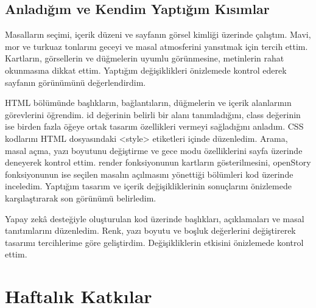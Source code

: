 \documentclass[12pt,a4paper]{article}
\begin{document}
\subsection{Anladığım ve Kendim Yaptığım Kısımlar}
Masalların seçimi, içerik düzeni ve sayfanın görsel kimliği üzerinde çalıştım. Mavi, mor ve turkuaz tonlarını geceyi ve masal atmosferini yansıtmak için tercih ettim. Kartların, görsellerin ve düğmelerin uyumlu görünmesine, metinlerin rahat okunmasına dikkat ettim. Yaptığım değişiklikleri önizlemede kontrol ederek sayfanın görünümünü değerlendirdim.

HTML bölümünde başlıkların, bağlantıların, düğmelerin ve içerik alanlarının görevlerini öğrendim. id değerinin belirli bir alanı tanımladığını, class değerinin ise birden fazla öğeye ortak tasarım özellikleri vermeyi sağladığını anladım. CSS kodlarını HTML dosyasındaki <style> etiketleri içinde düzenledim.
Arama, masal açma, yazı boyutunu değiştirme ve gece modu özelliklerini sayfa üzerinde deneyerek kontrol ettim. render fonksiyonunun kartların gösterilmesini, openStory fonksiyonunun ise seçilen masalın açılmasını yönettiği bölümleri kod üzerinde inceledim. Yaptığım tasarım ve içerik değişikliklerinin sonuçlarını önizlemede karşılaştırarak son görünümü belirledim.



Yapay zekâ desteğiyle oluşturulan kod üzerinde başlıkları,
açıklamaları ve masal tanıtımlarını düzenledim. Renk,
yazı boyutu ve boşluk değerlerini değiştirerek tasarımı
tercihlerime göre geliştirdim. Değişikliklerin etkisini
önizlemede kontrol ettim.

% 

\newpage 
\section{Haftalık Katkılar}
\end{document}

